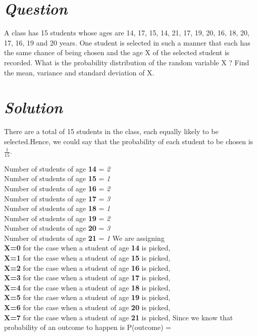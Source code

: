 \documentclass[journal,12pt,twocolumn]{IEEEtran}
\begin{document}
\section * {\emph{Question}}
A class has 15 students whose ages are 14, 17, 15, 14, 21, 17, 19, 20, 16, 18, 20, 17, 16, 19 and 20 years. One student is selected in such a manner that each has the same chance of being chosen and the age X of the selected student is recorded. What is the  probability distribution of the random variable X ? Find the  mean, variance and standard deviation of X.
\section*{\emph{Solution}}
There are a total of 15 students in the class, each equally likely to be selected.Hence, we could say that the probability of each student to be chosen is \textbf{$\frac{1}{15}$}.

   Number of students of age \textbf{14} = \emph{2}
\\ Number of students of age \textbf{15} = \emph{1}
\\ Number of students of age \textbf{16} = \emph{2}
\\ Number of students of age \textbf{17} = \emph{3}
\\ Number of students of age \textbf{18} = \emph{1}
\\ Number of students of age \textbf{19} = \emph{2}
\\ Number of students of age \textbf{20} = \emph{3}
\\ Number of students of age \textbf{21} = \emph{1}
We are assigning 
\\  \textbf{X=0} for the case when a student of age \textbf{14} is picked,
\\  \textbf{X=1} for the case when a student of age \textbf{15} is picked, 
\\  \textbf{X=2} for the case when a student of age \textbf{16} is picked,
\\  \textbf{X=3} for the case when a student of age \textbf{17} is picked,
\\  \textbf{X=4} for the case when a student of age \textbf{18} is picked,
\\  \textbf{X=5} for the case when a student of age \textbf{19} is picked,
\\  \textbf{X=6} for the case when a student of age \textbf{20} is picked,
\\  \textbf{X=7} for the case when a student of age \textbf{21} is picked,
Since we know that probability of an outcome to happen is P(outcome) =
\end{document}
